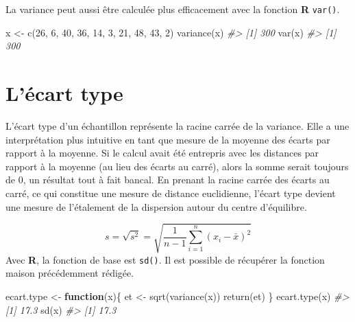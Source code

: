 \documentclass[
]{book}
\newenvironment{Shaded}{}{}
\newcommand{\CommentTok}[1]{\textit{#1}}
\newcommand{\ControlFlowTok}[1]{\textbf{#1}}
\newcommand{\DecValTok}[1]{#1}
\newcommand{\FunctionTok}[1]{#1}
\newcommand{\NormalTok}[1]{#1}
\newcommand{\OtherTok}[1]{#1}
\begin{document}
La variance peut aussi être calculée plus efficacement avec la fonction \textbf{R} \texttt{var()}.

\begin{Shaded}
\begin{Highlighting}[]
\NormalTok{x }\OtherTok{\textless{}{-}} \FunctionTok{c}\NormalTok{(}\DecValTok{26}\NormalTok{, }\DecValTok{6}\NormalTok{, }\DecValTok{40}\NormalTok{, }\DecValTok{36}\NormalTok{, }\DecValTok{14}\NormalTok{, }\DecValTok{3}\NormalTok{, }\DecValTok{21}\NormalTok{, }\DecValTok{48}\NormalTok{, }\DecValTok{43}\NormalTok{, }\DecValTok{2}\NormalTok{)}
\FunctionTok{variance}\NormalTok{(x)}
\CommentTok{\#\textgreater{} [1] 300}
\FunctionTok{var}\NormalTok{(x)}
\CommentTok{\#\textgreater{} [1] 300}
\end{Highlighting}
\end{Shaded}

\hypertarget{luxe9cart-type}{%
\section{L'écart type}\label{luxe9cart-type}}

L'écart type d'un échantillon représente la racine carrée de la variance. Elle a une interprétation plus intuitive en tant que mesure de la moyenne des écarts par rapport à la moyenne. Si le calcul avait été entrepris avec les distances par rapport à la moyenne (au lieu des écarts au carré), alors la somme serait toujours de 0, un résultat tout à fait bancal. En prenant la racine carrée des écarts au carré, ce qui constitue une mesure de distance euclidienne, l'écart type devient une mesure de l'étalement de la dispersion autour du centre d'équilibre.

\[
s =\sqrt{s^2}= \sqrt{\frac{1}{n-1}\sum_{i=1}^n(x_i-\bar{x})^2}
\]
Avec \textbf{R}, la fonction de base est \texttt{sd()}. Il est possible de récupérer la fonction maison précédemment rédigée.

\begin{Shaded}
\begin{Highlighting}[]
\NormalTok{ecart.type }\OtherTok{\textless{}{-}} \ControlFlowTok{function}\NormalTok{(x)\{}
\NormalTok{  et }\OtherTok{\textless{}{-}} \FunctionTok{sqrt}\NormalTok{(}\FunctionTok{variance}\NormalTok{(x))}
  \FunctionTok{return}\NormalTok{(et)}
\NormalTok{\}}
\FunctionTok{ecart.type}\NormalTok{(x)}
\CommentTok{\#\textgreater{} [1] 17.3}
\FunctionTok{sd}\NormalTok{(x)}
\CommentTok{\#\textgreater{} [1] 17.3}
\end{Highlighting}
\end{Shaded}
\end{document}
